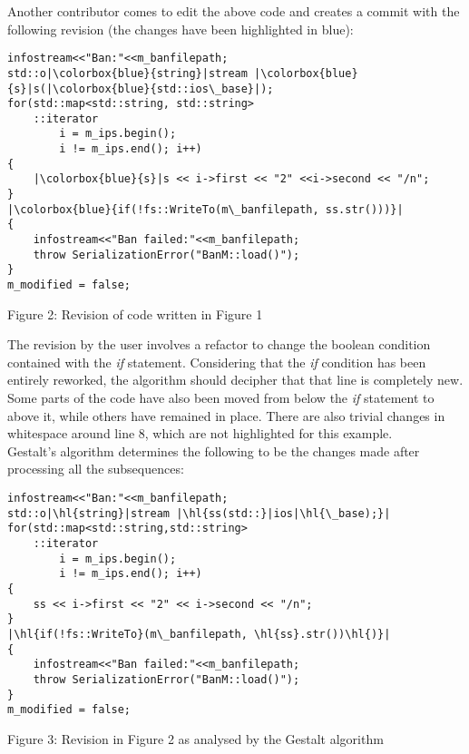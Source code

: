 Another contributor comes to edit the above code and creates a commit with the following revision (the changes have been highlighted in blue):

\setlength{\fboxsep}{1pt}
\begin{verbatim}
infostream<<"Ban:"<<m_banfilepath;
std::o|\colorbox{blue}{string}|stream |\colorbox{blue}{s}|s(|\colorbox{blue}{std::ios\_base}|);
for(std::map<std::string, std::string>
    ::iterator
        i = m_ips.begin();
        i != m_ips.end(); i++)
{
    |\colorbox{blue}{s}|s << i->first << "2" <<i->second << "/n";
}
|\colorbox{blue}{if(!fs::WriteTo(m\_banfilepath, ss.str()))}|
{
    infostream<<"Ban failed:"<<m_banfilepath;
    throw SerializationError("BanM::load()");
}
m_modified = false;
\end{verbatim}
\begin{center}
    \caption{Figure 2: Revision of code written in Figure 1 \citep{ahola_2018}}
\end{center}

The revision by the user involves a refactor to change the boolean condition contained with the \textit{if} statement. Considering that the \textit{if} condition has been entirely reworked, the algorithm should decipher that that line is completely new. Some parts of the code have also been moved from below the \textit{if} statement to above it, while others have remained in place. There are also trivial changes in whitespace around line 8, which are not highlighted for this example.\\Gestalt's algorithm determines the following to be the changes made after processing all the subsequences:


\begin{verbatim}
infostream<<"Ban:"<<m_banfilepath;
std::o|\hl{string}|stream |\hl{ss(std::}|ios|\hl{\_base);}|
for(std::map<std::string,std::string>
    ::iterator
        i = m_ips.begin();
        i != m_ips.end(); i++)
{
    ss << i->first << "2" << i->second << "/n";
}
|\hl{if(!fs::WriteTo}(m\_banfilepath, \hl{ss}.str())\hl{)}|
{
    infostream<<"Ban failed:"<<m_banfilepath;
    throw SerializationError("BanM::load()");
}
m_modified = false;
\end{verbatim}
\begin{center}
    \caption{Figure 3: Revision in Figure 2 as analysed by the Gestalt algorithm \citep{ahola_2018}}
\end{center}

